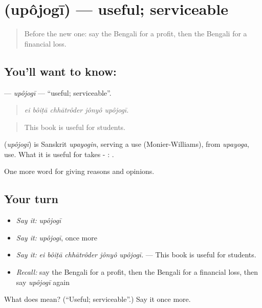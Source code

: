 \section[\texorpdfstring{\bn{উপযোগী} (upôjogī)}{উপযোগী (upôjogī)}]{ (upôjogī) — useful; serviceable}

\label{lesson:BN-C331-upojogi}



\begin{quote}
Before the new one: say the Bengali for a profit, then the Bengali for a financial loss.
\end{quote}

\subsection*{You'll want to know: }
\textbf{} — \emph{upôjogī} — \textquotedblleft{}useful; serviceable\textquotedblright{}.

\begin{quote}
    
\end{quote}

\begin{quote}
\emph{ei bôiṭā chhātrôder jônyô upôjogī.}
\end{quote}

\begin{quote}
This book is useful for students.
\end{quote}

\begin{cousinweb}
\textbf{} (\emph{upôjogī}) is Sanskrit \emph{upayogin}, serving a use (Monier-Williams), from \emph{upayoga}, use. What it is useful for takes - :   .
\end{cousinweb}

\begin{grammarlens}[title={What you've built}]
One more word for giving reasons and opinions.
\end{grammarlens}

\subsection*{Your turn}
\begin{itemize}
\raggedright
  \item \emph{Say it:} \emph{upôjogī}
  \item \emph{Say it:} \emph{upôjogī}, once more
  \item \emph{Say it:} \emph{ei bôiṭā chhātrôder jônyô upôjogī.} — This book is useful for students.
  \item \emph{Recall:} say the Bengali for a profit, then the Bengali for a financial loss, then say \emph{upôjogī} again
\end{itemize}

\begin{tcolorbox}[breakable,colback=teal!4,colframe=teal!35!black,title={Before you move on}]
What does  mean? (\textquotedblleft{}Useful; serviceable\textquotedblright{}.) Say it once more.
\end{tcolorbox}
